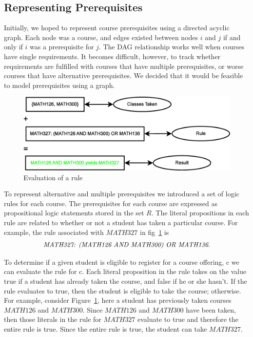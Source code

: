 \documentclass[11pt]{article} %
\begin{document}
\subsection{Representing Prerequisites} Initially, we hoped to represent course
prerequisites using a directed acyclic graph. Each node was a course, and edges
existed between nodes $i$ and $j$ if and only if $i$ was a prerequisite for $j$.
The DAG relationship works well when courses have single requirements. It
becomes difficult, however, to track whether requirements are fulfilled with courses
that have multiple prerequisites, or worse courses that have alternative
prerequisites. We decided that it would be feasible to model prerequisites
using a graph.
\begin{figure} [ht] \begin{center}
\includegraphics[scale=0.4]{prereq_logic_example} \end{center}
\caption{Evaluation of a rule} \label{logic_ex} \end{figure}

To represent alternative and multiple prerequisites we introduced a set of logic
rules for each course. The prerequisites for each course are expressed as
propositional logic statements stored in the set $R$. The literal propositions
in each rule are related to whether or not a student has taken a particular
course. For example, the rule associated with $MATH327$ in fig~\ref{logic_ex} is
$$ \text{{\it MATH327: (MATH126 AND MATH300) OR MATH136}}.$$

To determine if a given student is eligible to register for a course offering,
c we can evaluate the rule for c. Each literal proposition in the rule takes on
the value true if a student has already taken the course, and false if he or she
hasn't.  If the rule evaluates to true, then the student is eligible to take the
course; otherwise. For example, consider Figure~\ref{logic_ex}, here a student
has previously taken courses $MATH126$ and $MATH300$. Since $MATH126$ and
$MATH300$ have been taken, then those literals in the rule for $MATH327$
evaluate to true and therefore the entire rule is true.  Since the entire rule
is true, the student can take $MATH327$.
\end{document}
